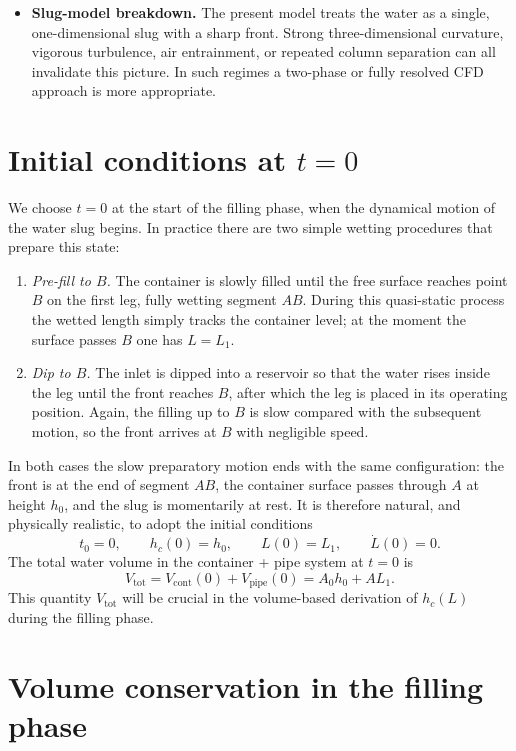 \documentclass[11pt]{article}
\begin{document}
\begin{itemize}
  \item \textbf{Slug-model breakdown.} The present model treats the water as a single,
    one-dimensional slug with a sharp front. Strong three-dimensional curvature, vigorous
    turbulence, air entrainment, or repeated column separation can all invalidate this
    picture. In such regimes a two-phase or fully resolved CFD approach is more
    appropriate.
\end{itemize}

\section{Initial conditions at \texorpdfstring{$t=0$}{t=0}}

We choose $t = 0$ at the start of the filling phase, when the dynamical motion of the
water slug begins. In practice there are two simple wetting procedures that prepare this
state:
\begin{enumerate}
  \item \emph{Pre-fill to $B$.} The container is slowly filled until the free surface reaches
        point $B$ on the first leg, fully wetting segment $AB$. During this quasi-static
        process the wetted length simply tracks the container level; at the moment the
        surface passes $B$ one has $L=L_1$.
  \item \emph{Dip to $B$.} The inlet is dipped into a reservoir so that the water rises inside
        the leg until the front reaches $B$, after which the leg is placed in its operating
        position. Again, the filling up to $B$ is slow compared with the subsequent motion,
        so the front arrives at $B$ with negligible speed.
\end{enumerate}
In both cases the slow preparatory motion ends with the same configuration: the front is
at the end of segment $AB$, the container surface passes through $A$ at height $h_0$, and
the slug is momentarily at rest. It is therefore natural, and physically realistic, to adopt
the initial conditions
\begin{equation}
  t_0 = 0,\qquad h_c(0)=h_0,\qquad L(0) = L_1,\qquad \dot L(0) = 0.
  \label{eq:IC}
\end{equation}
The total water volume in the container + pipe system at $t = 0$ is
\[
  V_{\text{tot}}
  = V_{\text{cont}}(0) + V_{\text{pipe}}(0)
  = A_0 h_0 + A L_1.
\]
This quantity $V_{\text{tot}}$ will be crucial in the volume-based derivation of $h_c(L)$ during
the filling phase.

\section{Volume conservation in the filling phase}
\end{document}
